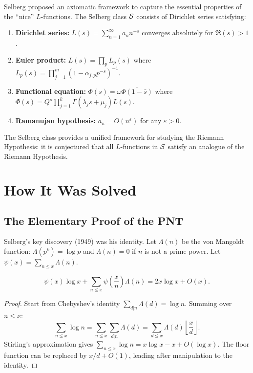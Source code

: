 Selberg proposed an axiomatic framework to capture the essential properties of the ``nice'' \(L\)-functions. The Selberg class \(\mathcal{S}\) consists of Dirichlet series satisfying:
\begin{enumerate}
    \item \textbf{Dirichlet series:} \(L(s) = \sum_{n=1}^{\infty} a_n n^{-s}\) converges absolutely for \(\Re(s) > 1\).
    \item \textbf{Euler product:} \(L(s) = \prod_p L_p(s)\) where \(L_p(s) = \prod_{j=1}^m (1 - \alpha_{j,p} p^{-s})^{-1}\).
    \item \textbf{Functional equation:} \(\Phi(s) = \omega \overline{\Phi(1-\bar s)}\) where \(\Phi(s) = Q^s \prod_{j=1}^k \Gamma(\lambda_j s + \mu_j) L(s)\).
    \item \textbf{Ramanujan hypothesis:} \(a_n = O(n^\varepsilon)\) for any \(\varepsilon > 0\).
\end{enumerate}

The Selberg class provides a unified framework for studying the Riemann Hypothesis: it is conjectured that all \(L\)-functions in \(\mathcal{S}\) satisfy an analogue of the Riemann Hypothesis.

\section{How It Was Solved}

\subsection{The Elementary Proof of the PNT}

Selberg's key discovery (1949) was his identity. Let \(\Lambda(n)\) be the von Mangoldt function: \(\Lambda(p^k) = \log p\) and \(\Lambda(n) = 0\) if \(n\) is not a prime power. Let \(\psi(x) = \sum_{n \leq x} \Lambda(n)\).

\begin{theorem}
\[
\psi(x) \log x + \sum_{n \leq x} \psi\!\left(\frac{x}{n}\right) \Lambda(n) = 2x \log x + O(x).
\]
\end{theorem}

\begin{proof}
Start from Chebyshev's identity \(\sum_{d|n} \Lambda(d) = \log n\). Summing over \(n \leq x\):
\[
\sum_{n \leq x} \log n = \sum_{n \leq x} \sum_{d|n} \Lambda(d) = \sum_{d \leq x} \Lambda(d) \left\lfloor \frac{x}{d} \right\rfloor.
\]
Stirling's approximation gives \(\sum_{n \leq x} \log n = x \log x - x + O(\log x)\). The floor function can be replaced by \(x/d + O(1)\), leading after manipulation to the identity. \end{proof}

